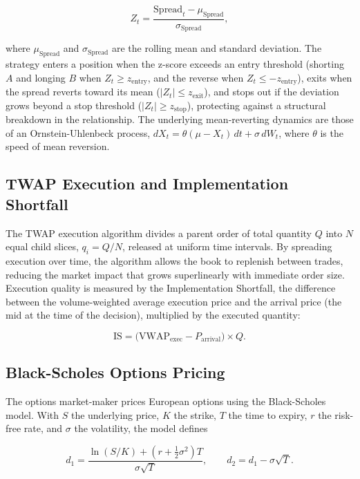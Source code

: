 \documentclass[12pt,oneside,a4paper]{report}
\begin{document}
\begin{equation}
Z_t = \frac{\text{Spread}_t - \mu_{\text{Spread}}}{\sigma_{\text{Spread}}},
\label{eq:zscore}
\end{equation}

where $\mu_{\text{Spread}}$ and $\sigma_{\text{Spread}}$ are the rolling mean and standard deviation. The strategy enters a position when the z-score exceeds an entry threshold (shorting $A$ and longing $B$ when $Z_t \geq z_{\text{entry}}$, and the reverse when $Z_t \leq -z_{\text{entry}}$), exits when the spread reverts toward its mean ($|Z_t| \leq z_{\text{exit}}$), and stops out if the deviation grows beyond a stop threshold ($|Z_t| \geq z_{\text{stop}}$), protecting against a structural breakdown in the relationship. The underlying mean-reverting dynamics are those of an Ornstein-Uhlenbeck process, $dX_t = \theta(\mu - X_t)\,dt + \sigma\,dW_t$, where $\theta$ is the speed of mean reversion.

\subsection{TWAP Execution and Implementation Shortfall}

The TWAP execution algorithm divides a parent order of total quantity $Q$ into $N$ equal child slices, $q_i = Q/N$, released at uniform time intervals. By spreading execution over time, the algorithm allows the book to replenish between trades, reducing the market impact that grows superlinearly with immediate order size. Execution quality is measured by the Implementation Shortfall, the difference between the volume-weighted average execution price and the arrival price (the mid at the time of the decision), multiplied by the executed quantity:

\begin{equation}
\text{IS} = \big(\text{VWAP}_{\text{exec}} - P_{\text{arrival}}\big) \times Q.
\label{eq:is}
\end{equation}

\subsection{Black-Scholes Options Pricing}

The options market-maker prices European options using the Black-Scholes model. With $S$ the underlying price, $K$ the strike, $T$ the time to expiry, $r$ the risk-free rate, and $\sigma$ the volatility, the model defines

\begin{equation}
d_1 = \frac{\ln(S/K) + (r + \tfrac{1}{2}\sigma^{2})T}{\sigma\sqrt{T}}, \qquad d_2 = d_1 - \sigma\sqrt{T}.
\label{eq:d1d2}
\end{equation}
\end{document}
